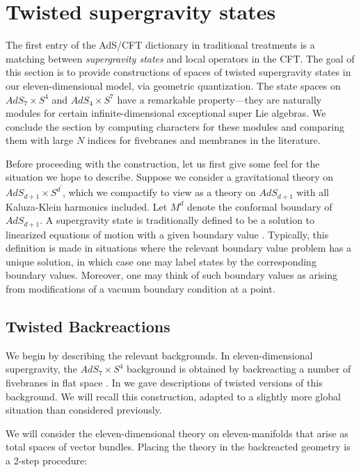 %
%
%

\section{Twisted supergravity states}
\label{sec:states}

The first entry of the AdS/CFT dictionary in traditional treatments is a matching between \textit{supergravity states} and local operators in the CFT.
The goal of this section is to provide constructions of spaces of twisted supergravity states in our eleven-dimensional model, via geometric quantization. The state spaces on $AdS_{7}\times S^{4}$ and $AdS_{4}\times S^{7}$ have a remarkable property---they are naturally modules for certain infinite-dimensional exceptional super Lie algebras. We conclude the section by computing characters for these modules and comparing them with large $N$ indices for fivebranes and membranes in the literature.

Before proceeding with the construction, let us first give some feel for the situation we hope to describe. Suppose we consider a gravitational theory on $AdS_{d+1}\times S^{d^{\prime}}$, which we compactify to view as a theory on $AdS_{d+1}$ with all Kaluza-Klein harmonics included. Let $M^{d}$ denote the conformal boundary of $AdS_{d+1}$. A supergravity state is traditionally defined to be a solution to linearized equations of motion with a given boundary value \cite{WittenHolography}. Typically, this definition is made in situations where the relevant boundary value problem has a unique solution, in which case one may label states by the corresponding boundary values. Moreover, one may think of such boundary values as arising from modifications of a vacuum boundary condition at a point.


\subsection{Twisted Backreactions}
We begin by describing the relevant backgrounds. In eleven-dimensional supergravity, the $AdS_7 \times S^4$ background is obtained by backreacting a number of fivebranes in flat space \cite{Maldacena:1997re,WittenAdS}.
In \cite{RSW} we gave descriptions of twisted versions of this background. We will recall this construction, adapted to a slightly more global situation than considered previously.

We will consider the eleven-dimensional theory on eleven-manifolds that arise as total spaces of vector bundles. Placing the theory in the backreacted geometry is a 2-step procedure:

